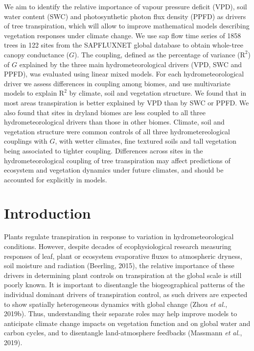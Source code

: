 \documentclass[11pt,twoside]{reedthesis}
\begin{document}
We aim to identify the relative importance of vapour pressure deficit
(VPD), soil water content (SWC) and photosynthetic photon flux density
(PPFD) as drivers of tree transpiration, which will allow to improve
mathematical models describing vegetation responses under climate
change. We use sap flow time series of 1858 trees in 122 sites from the
SAPFLUXNET global database to obtain whole-tree canopy conductance
(\(G\)). The coupling, defined as the percentage of variance
(\(\text{R}^{2}\)) of \(G\) explained by the three main
hydrometeorological drivers (VPD, SWC and PPFD), was evaluated using
linear mixed models. For each hydrometeorological driver we assess
differences in coupling among biomes, and use multivariate models to
explain \(\text{R}^{2}\) by climate, soil and vegetation structure. We
found that in most areas transpiration is better explained by VPD than
by SWC or PPFD. We also found that sites in dryland biomes are less
coupled to all three hydrometeorological drivers than those in other
biomes. Climate, soil and vegetation structure were common controls of
all three hydrometereological couplings with \(G\), with wetter
climates, fine textured soils and tall vegetation being associated to
tighter coupling. Differences across sites in the hydrometeorological
coupling of tree transpiration may affect predictions of ecosystem and
vegetation dynamics under future climates, and should be accounted for
explicitly in models.\par  \newpage

\section{Introduction}\label{introduction}

Plants regulate transpiration in response to variation in
hydrometeorological conditions. However, despite decades of
ecophysiological research measuring responses of leaf, plant or
ecosystem evaporative fluxes to atmospheric dryness, soil moisture and
radiation (Beerling, 2015), the relative importance of these drivers in
determining plant controls on transpiration at the global scale is still
poorly known. It is important to disentangle the biogeographical
patterns of the individual dominant drivers of transpiration control, as
such drivers are expected to show spatially heterogeneous dynamics with
global change (Zhou \emph{et al.}, 2019b). Thus, understanding their
separate roles may help improve models to anticipate climate change
impacts on vegetation function and on global water and carbon cycles,
and to disentangle land-atmosphere feedbacks (Massmann \emph{et al.},
2019).\par
\end{document}
